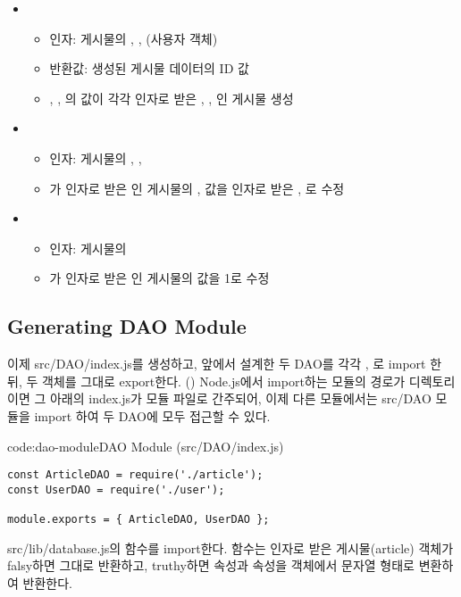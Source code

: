 \begin{itemize}
\begin{itemize}
    \end{itemize}
    \item {}
    \begin{itemize}
        \item 인자: 게시물의 , ,  (사용자 객체)
        \item 반환값: 생성된 게시물 데이터의 ID 값
        \item {}, , 의 값이 각각 인자로 받은 , , 인 게시물 생성
    \end{itemize}
    \item {}
    \begin{itemize}
        \item 인자: 게시물의 , , 
        \item {}가 인자로 받은 인 게시물의 ,  값을 인자로 받은 , 로 수정
    \end{itemize}
    \item {}
    \begin{itemize}
        \item 인자: 게시물의 
        \item {}가 인자로 받은 인 게시물의  값을 1로 수정
    \end{itemize}
\end{itemize}

\subsection*{Generating DAO Module}

이제 src/DAO/index.js를 생성하고, 앞에서 설계한 두 DAO를 각각 , 로 import 한 뒤, 두 객체를 그대로 export한다. () Node.js에서 import하는 모듈의 경로가 디렉토리이면 그 아래의 index.js가 모듈 파일로 간주되어, 이제 다른 모듈에서는 src/DAO 모듈을 import 하여 두 DAO에 모두 접근할 수 있다.

\begin{codeenv}{code:dao-module}{DAO Module (src/DAO/index.js)}\begin{verbatim}
const ArticleDAO = require('./article');
const UserDAO = require('./user');

module.exports = { ArticleDAO, UserDAO };
\end{verbatim}
\end{codeenv}

src/lib/database.js의  함수를 import한다.  함수는 인자로 받은 게시물(article) 객체가 falsy하면 그대로 반환하고, truthy하면  속성과  속성을  객체에서 문자열 형태로 변환하여 반환한다.
